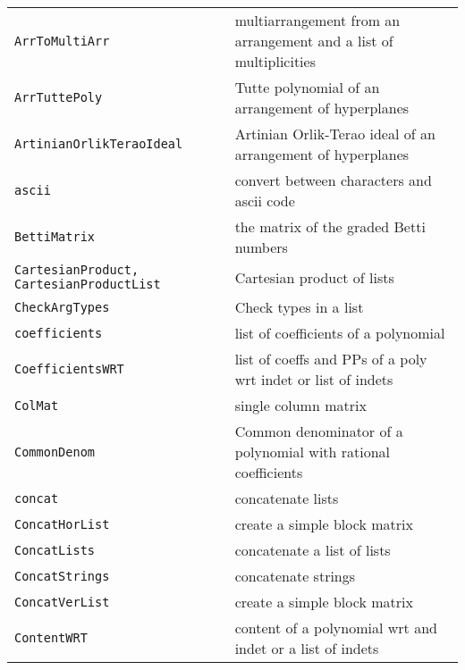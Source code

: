 \documentclass[a4paper]{mybook}
\begin{document}
\begin{center}
\begin{longtable}{ll}
{\verb~ArrToMultiArr~} &
      multiarrangement from an arrangement and a list of multiplicities\\
   
{\verb~ArrTuttePoly~} &
      Tutte polynomial of an arrangement of hyperplanes\\
   
{\verb~ArtinianOrlikTeraoIdeal~} &
      Artinian Orlik-Terao ideal of an arrangement of hyperplanes\\
   
{\verb~ascii~} &
      convert between characters and ascii code\\
   
{\verb~BettiMatrix~} &
      the matrix of the graded Betti numbers\\
   
{\verb~CartesianProduct, CartesianProductList~} &
      Cartesian product of lists\\
   
{\verb~CheckArgTypes~} &
      Check types in a list\\
   
{\verb~coefficients~} &
      list of coefficients of a polynomial\\
   
{\verb~CoefficientsWRT~} &
      list of coeffs and PPs of a poly wrt indet or list of indets\\
   
{\verb~ColMat~} &
      single column matrix\\
   
{\verb~CommonDenom~} &
      Common denominator of a polynomial with rational coefficients\\
   
{\verb~concat~} &
      concatenate lists\\
   
{\verb~ConcatHorList~} &
      create a simple block matrix\\
   
{\verb~ConcatLists~} &
      concatenate a list of lists\\
   
{\verb~ConcatStrings~} &
      concatenate strings\\
   
{\verb~ConcatVerList~} &
      create a simple block matrix\\
   
{\verb~ContentWRT~} &
      content of a polynomial wrt and indet or a list of indets\\
   

\end{longtable}
\end{center}
\end{document}
